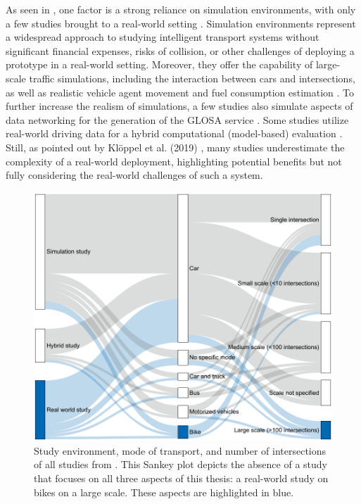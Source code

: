 As seen in , one factor is a strong reliance on simulation environments, with only a few studies brought to a real-world setting \cite{mellegard_day_2020}. Simulation environments represent a widespread approach to studying intelligent transport systems without significant financial expenses, risks of collision, or other challenges of deploying a prototype in a real-world setting. Moreover, they offer the capability of large-scale traffic simulations, including the interaction between cars and intersections, as well as realistic vehicle agent movement and fuel consumption estimation \cite{kloeppel_performance_2019, pariota_green_2019}. To further increase the realism of simulations, a few studies also simulate aspects of data networking for the generation of the GLOSA service \cite{sharara_impact_2019}. Some studies utilize real-world driving data for a hybrid computational (model-based) evaluation \cite{raubitschek_predictive_2011, luo_green_2017, xie_dynamic_2021, bhattacharyya_assessing_2022}. Still, as pointed out by Klöppel et al. (2019) \cite{kloeppel_performance_2019}, many studies underestimate the complexity of a real-world deployment, highlighting potential benefits but not fully considering the real-world challenges of such a system.

\begin{figure}
\centering
\includegraphics[width=\linewidth]{images/related-work-sankey.pdf}
\caption{Study environment, mode of transport, and number of intersections of all studies from . This Sankey plot depicts the absence of a study that focuses on all three aspects of this thesis: a real-world study on bikes on a large scale. These aspects are highlighted in blue.}
\label{fig:related-work-piechart}
\end{figure}

